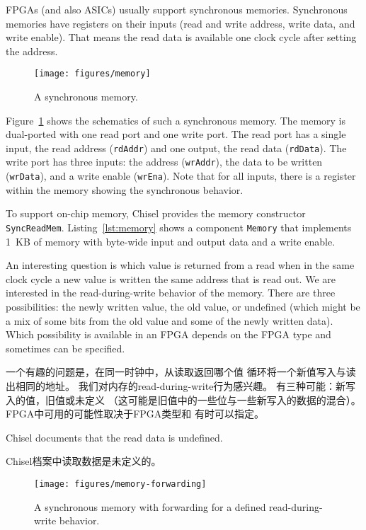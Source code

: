 \documentclass[%
    10pt,
    headinclude, footexclude,
    openright, %
    notitlepage,
    cleardoubleempty,
    headsepline,
    pointlessnumbers,
    bibtotoc, idxtotoc,
    ]{scrbook}
\newcommand{\code}[1]{{\small{\texttt{#1}}}}
\newcommand{\scale}{0.7}
\begin{document}
FPGAs (and also ASICs) usually support synchronous memories.
Synchronous memories have registers on their inputs (read and write address, write data,
and write enable). That means the read data is available one clock
cycle after setting the address.

\begin{figure}
  \centering
  \texttt{[image: figures/memory]}
  \caption{A synchronous memory.}
  \label{fig:memory}
\end{figure}

Figure~\ref{fig:memory} shows the schematics of such a synchronous memory.
The memory is dual-ported with one read port and one write port.
The read port has a single input, the read address (\code{rdAddr}) and
one output, the read data (\code{rdData}).
The write port has three inputs: the address (\code{wrAddr}), the data
to be written (\code{wrData}), and a write enable (\code{wrEna}).
Note that for all inputs, there is a register within the memory showing the
synchronous behavior.

To support on-chip memory, Chisel provides the memory constructor \code{SyncReadMem}.
Listing~\ref{lst:memory} shows a component \code{Memory} that implements
1~KB of memory with byte-wide input and output data and a write enable.


An interesting question is which value is returned from a read when in the same clock
cycle a new value is written the same address that is read out.
We are interested in the read-during-write behavior of the memory.
There are three possibilities: the newly written value, the old value, or undefined
(which might be a mix of some bits from the old value and some of the newly written data).
Which possibility is available in an FPGA depends on the FPGA type and
sometimes can be specified.

一个有趣的问题是，在同一时钟中，从读取返回哪个值
循环将一个新值写入与读出相同的地址。
我们对内存的read-during-write行为感兴趣。
有三种可能：新写入的值，旧值或未定义
（这可能是旧值中的一些位与一些新写入的数据的混合）。
FPGA中可用的可能性取决于FPGA类型和
有时可以指定。

Chisel documents that the read data is undefined.

Chisel档案中读取数据是未定义的。

\begin{figure}
  \centering
  \texttt{[image: figures/memory-forwarding]}
  \caption{A synchronous memory with forwarding for a defined read-during-write behavior.}
  \label{fig:memory:forwarding}
\end{figure}
\end{document}
